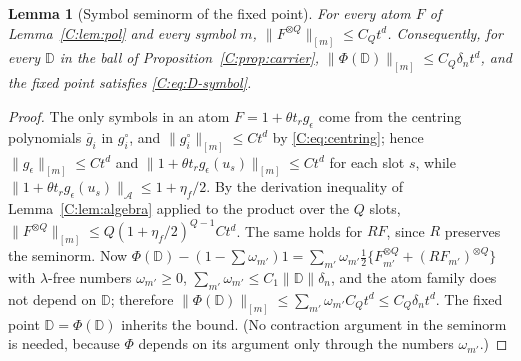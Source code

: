 \documentclass[11pt]{article}
\newtheorem{lemma}[lemma]{Lemma}
\newcommand{\cA}{\mathcal{A}}
\newcommand{\norm}[1]{\lVert #1\rVert}
\begin{document}
\begin{lemma}[Symbol seminorm of the fixed point]\label{C:lem:symbol}
For every atom \(F\) of Lemma~\ref{C:lem:pol} and every symbol \(m\),
\(\norm{F^{\otimes Q}}_{[m]}\le C_Qt^d\).  Consequently, for every
\(\mathbb D\) in the ball of Proposition~\ref{C:prop:carrier},
\(\norm{\Phi(\mathbb D)}_{[m]}\le C_Q\delta_nt^d\), and the fixed point
satisfies \eqref{C:eq:D-symbol}.
\end{lemma}
\begin{proof}
The only symbols in an atom \(F=1+\theta t_rg_\epsilon\) come from the
centring polynomials \(\overline g_i\) in \(g^\circ_i\), and
\(\norm{g^\circ_i}_{[m]}\le Ct^d\) by \eqref{C:eq:centring}; hence
\(\norm{g_\epsilon}_{[m]}\le Ct^d\) and \(\norm{1+\theta t_rg_\epsilon(u_s)}_{[m]}\le Ct^d\)
for each slot \(s\), while \(\norm{1+\theta t_rg_\epsilon(u_s)}_\cA\le1+\eta_f/2\).
By the derivation inequality of Lemma~\ref{C:lem:algebra} applied to the
product over the \(Q\) slots, \(\norm{F^{\otimes Q}}_{[m]}\le Q(1+\eta_f/2)^{Q-1}Ct^d\).
The same holds for \(RF\), since \(R\) preserves the seminorm.  Now
\(\Phi(\mathbb D)-(1-\sum\omega_{m'})1=\sum_{m'}\omega_{m'}\tfrac12\{F_{m'}^{\otimes Q}+(RF_{m'})^{\otimes Q}\}\)
with \(\lambda\)-free numbers \(\omega_{m'}\ge0\), \(\sum_{m'}\omega_{m'}\le C_1\norm{\mathbb D}\delta_n\),
and the atom family does not depend on \(\mathbb D\); therefore
\(\norm{\Phi(\mathbb D)}_{[m]}\le\sum_{m'}\omega_{m'}C_Qt^d\le C_Q\delta_nt^d\).
The fixed point \(\mathbb D=\Phi(\mathbb D)\) inherits the bound.  (No
contraction argument in the seminorm is needed, because \(\Phi\) depends on
its argument only through the numbers \(\omega_{m'}\).)
\end{proof}
\end{document}
